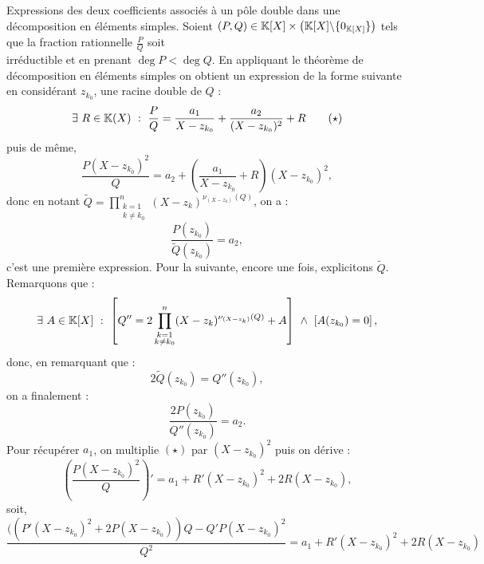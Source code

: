 \documentclass{article}
\begin{document}
\begin{question_kholle}
	[]
	{Expressions des deux coefficients associés à un pôle double dans une décomposition en éléments simples.}
	Soient $(P, Q) \in \mathbb K [X] \times \left( \mathbb K [X] \backslash \{ 0_{\mathbb K[X] }\} \right) $ tels que la fraction rationnelle $\frac{P}{Q}$ soit \\ irréductible et en prenant $\deg P < \deg Q$. En appliquant le théorème de décomposition en éléments simples on obtient un expression de la forme suivante en considérant $z_{k_0}$, une racine double de $Q$ :
	\[
		\exists \ R \in \mathbb K (X) \ : \ \frac{P}{Q} = \frac{a_1}{X - z_{k_0}}  + \frac{a_2}{(X - z_{k_0})^2} + R \quad \quad (\star)
	\]
	puis de même,
	\[
		\frac{P(X - z_{k_0})^2}{Q} = a_2  + \left( \frac{a_1}{X - z_{k_0}} + R \right)(X - z_{k_0})^2,
	\]
	donc en notant $\widetilde{Q} = \displaystyle \prod_{\substack{k=1 \\ k\neq k_0}}^n(X-z_k)^{\nu_{(X-z_k)}(Q)}$, on a :
	\[
		\frac{P(z_{k_0})}{\widetilde{Q}(z_{k_0})} = a_2,
	\]
	c'est une première expression. Pour la suivante, encore une fois, explicitons $\widetilde{Q}$. Remarquons que :
	\[
		\exists \ A \in \mathbb K [X] \ : \ \left[ Q'' = 2\prod_{\substack{k=1 \\ k \neq k_0}}^n (X-z_k)^{\nu_{(X-z_k)}(Q)} + A \right] \ \wedge \ \left[ A(z_{k_0} ) = 0 \right],
	\]
	donc, en remarquant que :
	\[
		2\widetilde{Q}(z_{k_0}) = Q''(z_{k_0}),
	\]
	on a finalement :
	\[
		\frac{2P(z_{k_0})}{Q''(z_{k_0})} = a_2.
	\]
	Pour récupérer $a_1$, on multiplie $(\star )$ par $(X- z_{k_0})^2$ puis on dérive :
	\[
		\left( \frac{P  ( X - z_{k_0})^2}{Q}\right)' =  a_1 + R'(X-z_{k_0})^2 + 2R(X - z_{k_0}),
	\]
	soit,
	\[
		\frac{((P'(X - z_{k_0})^2 + 2P(X-z_{k_0}))Q - Q'P(X-z_{k_0})^2 }{Q^2}  = a_1 + R'(X-z_{k_0})^2 + 2R(X - z_{k_0})
	\]
\end{question_kholle}
\end{document}
